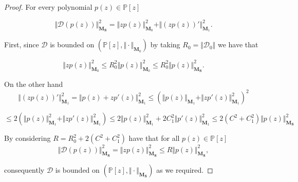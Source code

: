 \documentclass[12pt]{amsart}
\theoremstyle{definition}
\theoremstyle{plain}
\newtheorem{prop}{Proposition}
\theoremstyle{remark}
\begin{document}


\begin{proof} For every polynomial $p(z)\in \mathbb{P}[z]$


$$
\Vert \mathcal{D}(p(z)) \Vert^2_{\mathbf{M}_{\mathbf{S}}}=  \Vert zp(z) \Vert^2_{\mathbf{M}_0} + \Vert (zp(z))' \Vert^2_{\mathbf{M}_1}.
$$
\bigskip


\noindent First, since $\mathcal{D}$ is bounded on $(\mathbb{P}[z], \Vert \cdot \Vert_{\mathbf{M}_0})$ by taking  $R_0= \Vert \mathcal{D}_0 \Vert $ we have that 

$$\Vert zp(z) \Vert^2_{\mathbf{M}_0} \leq R^2_{0} \Vert p(z)\Vert^2_{\mathbf{M}_0} \leq R_0^2 \Vert p(z)\Vert^2_{\mathbf{M}_{\mathbf{S}}}.
$$

\noindent On the other hand 
$$
\Vert (zp(z))' \Vert^2_{\mathbf{M}_1}= \Vert p(z) + zp'(z) \Vert^{2}_{\mathbf{M}_1} \leq (\Vert p(z) \Vert_{\mathbf{M}_1} + \Vert zp'(z) \Vert^{2}_{\mathbf{M}_1} )^2 
$$



$$ \leq 
2( \Vert p(z) \Vert_{\mathbf{M}_1}^{2} + \Vert zp'(z) \Vert^{2}_{\mathbf{M}_1} )\leq
2\Vert p(z) \Vert_{\mathbf{M}_1}^{2} + 2C_1^2\Vert p'(z) \Vert^{2}_{\mathbf{M}_1} \leq 2(C^2+C_1^2) \Vert p(z) \Vert_{\mathbf{M}_{\mathbf{S}}}^{2} 
$$


\smallskip 



\noindent By considering  $R=R_{0}^{2}+2(C^2+C_1^2) $ have that for all $p(z)\in \mathbb{P}[z]$ 
$$
\Vert \mathcal{D}(p(z)) \Vert^2_{\mathbf{M}_{\mathbf{S}}}= \Vert zp(z)\Vert_{\mathbf{M}_{\mathbf{S}}}^{2} \leq R \Vert p(z) \Vert^2_{\mathbf{M}_{\mathbf{S}}},
$$

\noindent consequently 
$\mathcal{D}$ is bounded on $(\mathbb{P}[z], \Vert \cdot \Vert_{\mathbf{M_S}})$ as we required. 
\end{proof}
\end{document}
